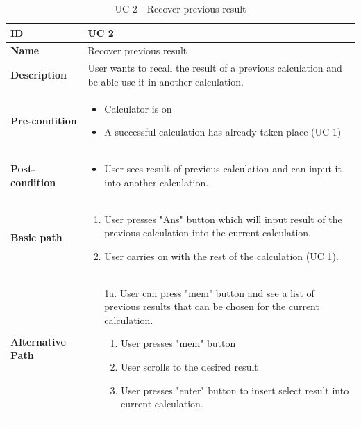 \documentclass[a4paper]{article}
\begin{document}
\begin{table}[!h]
\begin{tabular}{|p{3cm}|p{9cm}|}
\hline
\textbf{ID} & UC 2  \\ \hline
\textbf{Name} & Recover previous result  \\ \hline
\textbf{Description} & User wants to recall the result of a previous calculation and be able use it in another calculation.  \\ \hline
\textbf{Pre-condition} &
	\begin{itemize}
		\vspace{-2mm}
		\item Calculator is on
		\item A successful calculation has already taken place (UC 1)
		\vspace{-3.5mm}
	\end{itemize}  \\ \hline
\textbf{Post-condition} &
	\begin{itemize}
		\vspace{-2mm}
		\item User sees result of previous calculation and can input it into another calculation.
		\vspace{-3.5mm}
	\end{itemize}  \\ \hline
\textbf{Basic path} &
	\begin{enumerate}
		\vspace{-2mm}
		\item User presses "Ans" button which will input result of the previous calculation into the current calculation.
		\item User carries on with the rest of the calculation (UC 1).
		\vspace{-3.5mm}
	\end{enumerate}  \\ \hline
\textbf{Alternative Path} &
	\begin{itemize}[leftmargin=6mm]
		\vspace{-2mm}
		\item [1a.] User can press "mem" button and see a list of previous results that can be chosen for the current calculation.
			\begin{enumerate}
				\item User presses "mem" button
				\item User scrolls to the desired result
				\item User presses "enter" button to insert select result into current calculation.
			\end{enumerate}
		
		\vspace{-3.5mm}
	\end{itemize}  \\ \hline
\end{tabular}
\caption{UC 2 - Recover previous result}
\end{table}
\pagebreak
\end{document}
